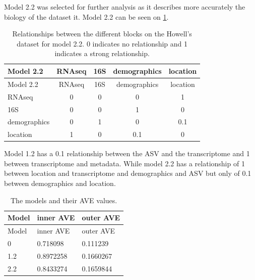 \documentclass[
  a4paper,
]{book}
\begin{document}
Model 2.2 was selected for further analysis as it describes more accurately the biology of the dataset it.
Model 2.2 can be seen on \ref{tab:howell-model2-2}.

\begin{longtable}[]{@{}lcccc@{}}
\caption{\label{tab:howell-model2-2} Relationships between the different blocks on the Howell's dataset for model 2.2. 0 indicates no relationship and 1 indicates a strong relationship.}\tabularnewline
\toprule
Model 2.2 & RNAseq & 16S & demographics & location \\
\midrule
\endfirsthead
\toprule
Model 2.2 & RNAseq & 16S & demographics & location \\
\midrule
\endhead
RNAseq & 0 & 0 & 0 & 1 \\
16S & 0 & 0 & 1 & 0 \\
demographics & 0 & 1 & 0 & 0.1 \\
location & 1 & 0 & 0.1 & 0 \\
\bottomrule
\end{longtable}

Model 1.2 has a 0.1 relationship between the ASV and the transcriptome and 1 between transcriptome and metadata.
While model 2.2 has a relationship of 1 between location and transcriptome and demographics and ASV but only of 0.1 between demographics and location.

\begin{longtable}[]{@{}lll@{}}
\caption{\label{tab:howell-models-ave} The models and their AVE values.}\tabularnewline
\toprule
Model & inner AVE & outer AVE \\
\midrule
\endfirsthead
\toprule
Model & inner AVE & outer AVE \\
\midrule
\endhead
0 & 0.718098 & 0.111239 \\
1.2 & 0.8972258 & 0.1660267 \\
2.2 & 0.8433274 & 0.1659844 \\
\bottomrule
\end{longtable}
\end{document}
